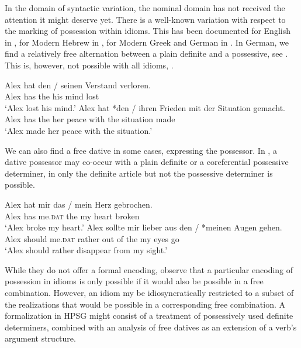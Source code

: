 \documentclass[output=paper]{langsci/langscibook}
\begin{document}
In the domain of syntactic variation, the nominal domain has not received the attention it might deserve yet. 
There is a well-known variation with respect to the marking of possession within idioms. 
This has been documented for English in \cite{Ho:15}, for Modern Hebrew in \cite{Almog:12}, for Modern Greek and German in \cite{Markantonatou:Sailer:16}. 
In German, we find a relatively free alternation between a plain definite and a possessive, see . This is, however, not possible with all idioms,  .

\eal \label{ex-verstand-herz}
\ex 
\gll Alex hat den / seinen Verstand verloren.\\
Alex has the {} his mind lost\\
\glt `Alex lost his mind.'\label{ex-verstand}
\ex 
\gll Alex hat *den / ihren Frieden mit der Situation gemacht.\\
     Alex has the {} her peace with the situation made\\
\glt `Alex made her peace with the situation.'\label{ex-frieden}
\zl 


We can also find a free dative in some cases, expressing the possessor. 
In , a dative possessor may co-occur with a plain definite or a coreferential possessive determiner, in  only the definite article but not the possessive determiner is possible.  


\eal \label{ex-herz-augen}
\ex 
\gll Alex hat mir das / mein Herz gebrochen.\\
Alex has me.\textsc{dat} the {} my heart broken\\
\glt `Alex broke my heart.'\label{ex-herz}
\ex 
\gll Alex sollte mir lieber aus den / *meinen Augen gehen.\\
Alex should me.\textsc{dat} rather {out of} the {} my eyes go\\
\glt `Alex should rather disappear from my sight.'\label{ex-augen}
\zl 

While they do not offer a formal encoding, \cite{Markantonatou:Sailer:16} observe that a particular encoding of possession in idioms is only possible if it would also be possible in a free combination. However, an idiom my be idiosyncratically restricted to a subset of the realizations that would be possible in a corresponding free combination. A formalization in HPSG might consist of a treatment of possessively used definite determiners, combined with an analysis of free datives as an extension of a verb's argument structure.
\end{document}
